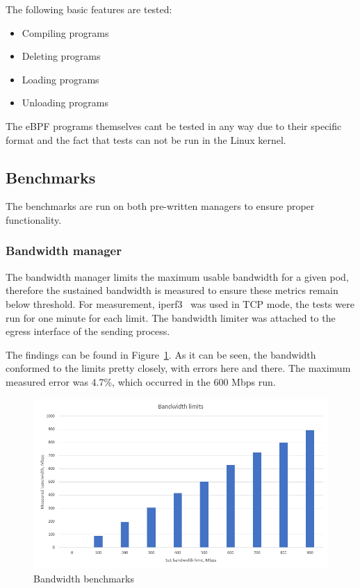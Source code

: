 \noindent
The following basic features are tested:
\begin{itemize}
	\item Compiling programs
	\item Deleting programs
	\item Loading programs
	\item Unloading programs
\end{itemize}

The eBPF programs themselves cant be tested in any way due to their specific format and the fact that tests can not be run in the Linux kernel.

\newpage
\subsection{Benchmarks}

The benchmarks are run on both pre-written managers to ensure proper functionality. 

\subsubsection{Bandwidth manager}
The bandwidth manager limits the maximum usable bandwidth for a given pod, therefore the sustained bandwidth is measured to ensure these metrics remain below threshold. For measurement, iperf3~\cite{iperf} was used in TCP mode, the tests were run for one minute for each limit. The bandwidth limiter was attached to the egress interface of the sending process.

The findings can be found in Figure~\ref{fig:bandwidthbench1}. As it can be seen, the bandwidth conformed to the limits pretty closely, with errors here and there. The maximum measured error was 4.7\%, which occurred in the 600 Mbps run.

\begin{figure}[H]
	\centering
	\includegraphics[width=\textwidth]{images/bandwidth.png}
	\caption{Bandwidth benchmarks}
	\label{fig:bandwidthbench1}
\end{figure}


